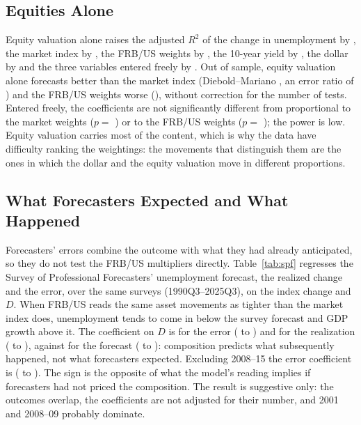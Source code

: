 \documentclass[11pt]{article}
\begin{document}


\subsection{Equities Alone}\label{sec:eqalone}
Equity valuation alone raises the adjusted $R^2$ of the change in unemployment by , the market index by , the FRB/US weights by , the 10-year yield by , the dollar by  and the three variables entered freely by . Out of sample, equity valuation alone forecasts better than the market index (Diebold--Mariano , an error ratio of ) and the FRB/US weights worse (), without correction for the number of tests. Entered freely, the coefficients are not significantly different from proportional to the market weights ($p=$ ) or to the FRB/US weights ($p=$ ); the power is low. Equity valuation carries most of the content, which is why the data have difficulty ranking the weightings: the movements that distinguish them are the ones in which the dollar and the equity valuation move in different proportions.

\subsection{What Forecasters Expected and What Happened}\label{sec:spf}
Forecasters' errors combine the outcome with what they had already anticipated, so they do not test the FRB/US multipliers directly. Table~\ref{tab:spf} regresses the Survey of Professional Forecasters' unemployment forecast, the realized change and the error, over the same  surveys (1990Q3--2025Q3), on the index change and $D$. When FRB/US reads the same asset movements as tighter than the market index does, unemployment tends to come in below the survey forecast and GDP growth above it. The coefficient on $D$ is  for the error ( to ) and  for the realization ( to ), against  for the forecast ( to ): composition predicts what subsequently happened, not what forecasters expected. Excluding 2008--15 the error coefficient is  ( to ). The sign is the opposite of what the model's reading implies if forecasters had not priced the composition. The result is suggestive only: the outcomes overlap, the coefficients are not adjusted for their number, and 2001 and 2008--09 probably dominate.
\end{document}
